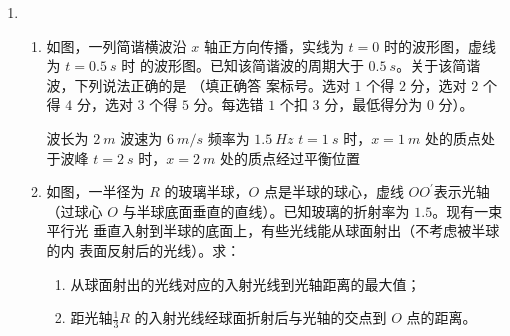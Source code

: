\begin{enumerate}
\item 
{}
\begin{enumerate}
	\item
如图，一列简谐横波沿 $ x $ 轴正方向传播，实线为 $ t=0 $ 时的波形图，虚线为 $ t=0.5 \ s $ 时
的波形图。已知该简谐波的周期大于 $ 0.5 \ s $。关于该简谐波，下列说法正确的是 \underlinegap （填正确答
案标号。选对 $ 1 $ 个得 $ 2 $ 分，选对 $ 2 $ 个得 $ 4 $ 分，选对 $ 3 $ 个得 $ 5 $ 分。每选错 $ 1 $ 个扣 $ 3 $ 分，最低得分为 $ 0 $
分）。
\begin{figure}[h!]
	\centering
	
\end{figure}


\fivechoices
{波长为 $ 2 \ m $}
{波速为 $ 6 \ m /s $}
{频率为 $ 1.5 \ Hz $}
{$ t=1 \ s $ 时，$ x=1 \ m $ 处的质点处于波峰}
{$ t=2 \ s $ 时，$ x=2 \ m $ 处的质点经过平衡位置}


\item 
如图，一半径为 $ R $ 的玻璃半球，$ O $ 点是半球的球心，虚线 $ OO ^{\prime} $表示光轴（过球心 $ O $
与半球底面垂直的直线）。已知玻璃的折射率为 $ 1.5 $。现有一束平行光
垂直入射到半球的底面上，有些光线能从球面射出（不考虑被半球的内
表面反射后的光线）。求：
\begin{enumerate}
	\item
从球面射出的光线对应的入射光线到光轴距离的最大值；
\item 
距光轴$  \frac{ 1 }{ 3 } R $ 的入射光线经球面折射后与光轴的交点到 $ O $ 点的距离。
	
\end{enumerate}
\begin{figure}[h!]
	\flushright
	
\end{figure}






\end{enumerate}
\end{enumerate}
